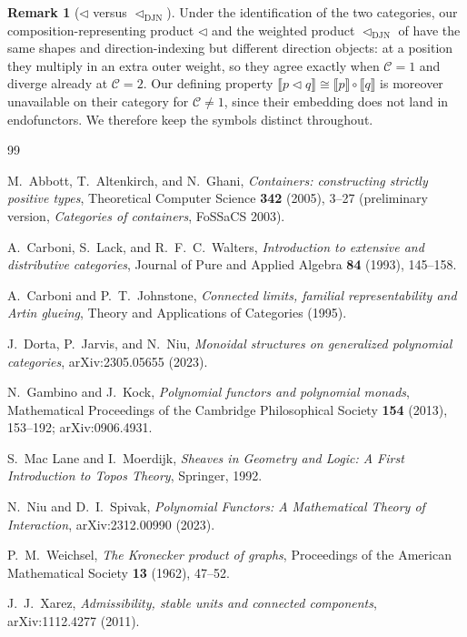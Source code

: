 \documentclass[11pt]{amsart}
\theoremstyle{plain}
\theoremstyle{definition}
\newtheorem{remark}[theorem]{Remark}
\newcommand{\C}{\mathcal{C}}
\newcommand{\ext}[1]{\llbracket #1 \rrbracket}
\newcommand{\comp}{\mathbin{\triangleleft}}
\newcommand{\compDJN}{\mathbin{\triangleleft_{\mathrm{DJN}}}}
\begin{document}
\begin{remark}[$\comp$ versus $\compDJN$]\label{rem:djn}
Under the identification of the two categories, our composition-representing product $\comp$ and the
weighted product $\compDJN$ of \cite{DJN} have the same shapes and direction-indexing but different
direction objects: at a position they multiply in an extra outer weight, so they agree exactly when
$\C=1$ and diverge already at $\C=2$. Our defining property $\ext{p\comp q}\cong\ext p\circ\ext q$ is
moreover unavailable on their category for $\C\neq1$, since their embedding does not land in
endofunctors. We therefore keep the symbols distinct throughout.
\end{remark}

\begin{thebibliography}{99}

M.~Abbott, T.~Altenkirch, and N.~Ghani,
\emph{Containers: constructing strictly positive types},
Theoretical Computer Science \textbf{342} (2005), 3--27
(preliminary version, \emph{Categories of containers}, FoSSaCS 2003).

A.~Carboni, S.~Lack, and R.~F.~C.~Walters,
\emph{Introduction to extensive and distributive categories},
Journal of Pure and Applied Algebra \textbf{84} (1993), 145--158.

A.~Carboni and P.~T.~Johnstone,
\emph{Connected limits, familial representability and Artin glueing},
Theory and Applications of Categories (1995).

J.~Dorta, P.~Jarvis, and N.~Niu,
\emph{Monoidal structures on generalized polynomial categories},
arXiv:2305.05655 (2023).

N.~Gambino and J.~Kock,
\emph{Polynomial functors and polynomial monads},
Mathematical Proceedings of the Cambridge Philosophical Society \textbf{154} (2013), 153--192;
arXiv:0906.4931.

S.~Mac Lane and I.~Moerdijk,
\emph{Sheaves in Geometry and Logic: A First Introduction to Topos Theory},
Springer, 1992.

N.~Niu and D.~I.~Spivak,
\emph{Polynomial Functors: A Mathematical Theory of Interaction},
arXiv:2312.00990 (2023).

P.~M.~Weichsel,
\emph{The Kronecker product of graphs},
Proceedings of the American Mathematical Society \textbf{13} (1962), 47--52.

J.~J.~Xarez,
\emph{Admissibility, stable units and connected components},
arXiv:1112.4277 (2011).


\end{thebibliography}
\end{document}
